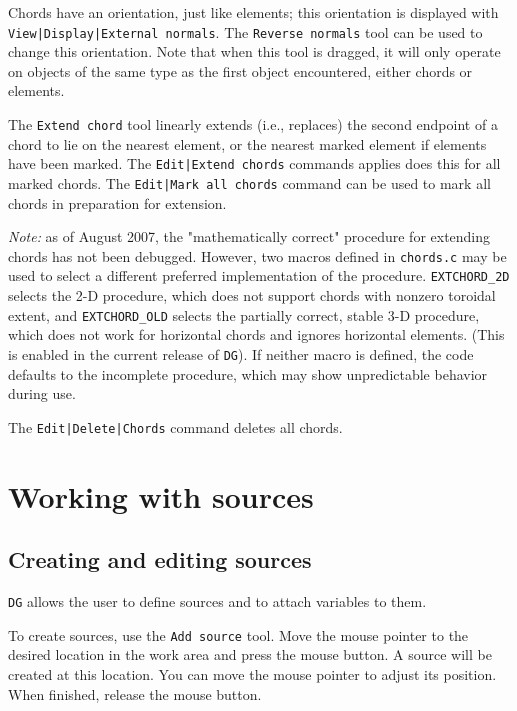 \documentclass[a4paper,10pt]{report}
\begin{document}
Chords have an orientation, just like elements; this
orientation is displayed with
{\tt View|Display|External normals}.
The {\tt Reverse normals} tool can be used to change this
orientation. Note that when this tool is dragged, it will only
operate on objects of the same type as the
first object encountered, either chords or elements.

The {\tt Extend chord} tool linearly
extends (i.e., replaces) the second endpoint of a chord to lie on
the nearest element, or the nearest marked element if elements have
been marked.  The
{\tt Edit|Extend chords} commands applies does
this for all marked chords.  The
{\tt Edit|Mark all chords} command can be used
to mark all chords in preparation for extension.

{\em Note:} as of August 2007, the "mathematically correct" procedure
for extending chords has not been debugged. However, two macros
defined in {\tt chords.c} may be used to select a different preferred
implementation of the procedure.  {\tt EXTCHORD\_2D}
selects the 2-D
procedure, which does not support chords with nonzero
toroidal extent,
and {\tt EXTCHORD\_OLD} selects the partially correct, stable
3-D procedure, which does not work for horizontal chords and ignores
horizontal elements. (This is enabled in the current
release of {\tt DG}).
If neither macro is defined, the code defaults to
the incomplete procedure, which may show unpredictable behavior during
use.

The {\tt Edit|Delete|Chords} command deletes all chords.

\section{Working with sources}

\subsection{Creating and editing sources}

{\tt DG} allows the user to define sources and to attach variables to them.

To create sources, use the {\tt Add source} tool. Move the mouse
pointer to the desired location in the work area and press the mouse
button. A source will be created at this location. You can move the
mouse pointer to adjust its position. When finished, release the
mouse button.
\end{document}
